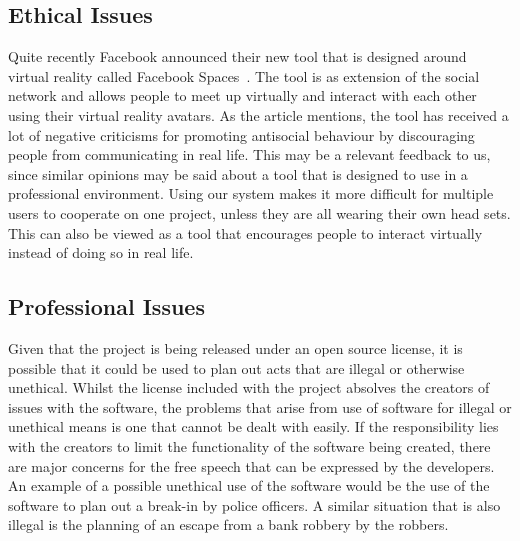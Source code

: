     \subsection{Ethical Issues}
        Quite recently Facebook announced their new tool that is designed around virtual reality called Facebook Spaces~\cite{facebook2017}. The tool is as extension of the social network and allows people to meet up virtually and interact with each other using their virtual reality avatars. As the article mentions, the tool has received a lot of negative criticisms for promoting antisocial behaviour by discouraging people from communicating in real life. This may be a relevant feedback to us, since similar opinions may be said about a tool that is designed to use in a professional environment. Using our system makes it more difficult for multiple users to cooperate on one project, unless they are all wearing their own head sets. This can also be viewed as a tool that encourages people to interact virtually instead of doing so in real life.
        
    \subsection{Professional Issues}
        Given that the project is being released under an open source license, it is possible that it could be used to plan out acts that are illegal or otherwise unethical. Whilst the license included with the project absolves the creators of issues with the software, the problems that arise from use of software for illegal or unethical means is one that cannot be dealt with easily. If the responsibility lies with the creators to limit the functionality of the software being created, there are major concerns for the free speech that can be expressed by the developers. An example of a possible unethical use of the software would be the use of the software to plan out a break-in by police officers. A similar situation that is also illegal is the planning of an escape from a bank robbery by the robbers.